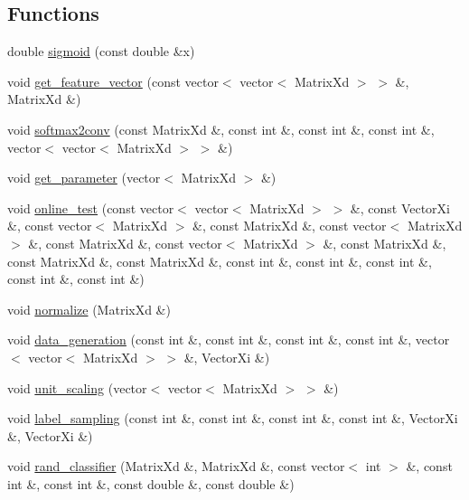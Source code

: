 \subsection*{\-Functions}
\begin{DoxyCompactItemize}
\item 
double \hyperlink{namespacelibcnn_a5b73556a76dfe9867c10ebd14519fb4e}{sigmoid} (const double \&x)
\item 
void \hyperlink{namespacelibcnn_a55bbe6e5488b8a038e5708a32d233090}{get\-\_\-feature\-\_\-vector} (const vector$<$ vector$<$ \-Matrix\-Xd $>$ $>$ \&, \-Matrix\-Xd \&)
\item 
void \hyperlink{namespacelibcnn_a78ed8e63be87c4d06bb363af95ce62ec}{softmax2conv} (const \-Matrix\-Xd \&, const int \&, const int \&, const int \&, vector$<$ vector$<$ \-Matrix\-Xd $>$ $>$ \&)
\item 
void \hyperlink{namespacelibcnn_a2c5ccad2e675235e71fd5e5641ede4ae}{get\-\_\-parameter} (vector$<$ \-Matrix\-Xd $>$ \&)
\item 
void \hyperlink{namespacelibcnn_a493fb452cedcc704e189ad1a3656c0ad}{online\-\_\-test} (const vector$<$ vector$<$ \-Matrix\-Xd $>$ $>$ \&, const \-Vector\-Xi \&, const vector$<$ \-Matrix\-Xd $>$ \&, const \-Matrix\-Xd \&, const vector$<$ \-Matrix\-Xd $>$ \&, const \-Matrix\-Xd \&, const vector$<$ \-Matrix\-Xd $>$ \&, const \-Matrix\-Xd \&, const \-Matrix\-Xd \&, const \-Matrix\-Xd \&, const int \&, const int \&, const int \&, const int \&, const int \&)
\item 
void \hyperlink{namespacelibcnn_ab161d6e7087d097f72c086587a661c4a}{normalize} (\-Matrix\-Xd \&)
\item 
void \hyperlink{namespacelibcnn_a022f9a6378aa94ec418eb757bead690e}{data\-\_\-generation} (const int \&, const int \&, const int \&, const int \&, vector$<$ vector$<$ \-Matrix\-Xd $>$ $>$ \&, \-Vector\-Xi \&)
\item 
void \hyperlink{namespacelibcnn_a4afdb4ab6bfd2c2167c593900ef644f5}{unit\-\_\-scaling} (vector$<$ vector$<$ \-Matrix\-Xd $>$ $>$ \&)
\item 
void \hyperlink{namespacelibcnn_a0f018efe5349302aba6f349d17cc90cf}{label\-\_\-sampling} (const int \&, const int \&, const int \&, const int \&, \-Vector\-Xi \&, \-Vector\-Xi \&)
\item 
void \hyperlink{namespacelibcnn_a367a409a55921d3810474a42357ff285}{rand\-\_\-classifier} (\-Matrix\-Xd \&, \-Matrix\-Xd \&, const vector$<$ int $>$ \&, const int \&, const int \&, const double \&, const double \&)
\item 

\end{DoxyCompactItemize}
